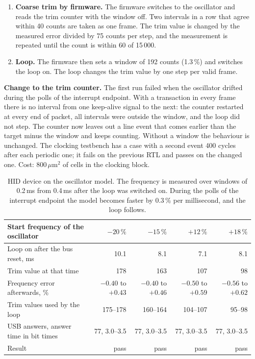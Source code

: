 \documentclass[10pt,a4paper]{article}
\begin{document}
\begin{enumerate}
\item \textbf{Coarse trim by firmware.} The firmware switches to the oscillator and reads the trim counter with
the window off. Two intervals in a row that agree within 40 counts are taken as one frame. The trim value is
changed by the measured error divided by 75 counts per step, and the measurement is repeated until the count
is within 60 of 15\,000.
\item \textbf{Loop.} The firmware then sets a window of 192 counts (1.3\,\%) and switches the loop on. The loop
changes the trim value by one step per valid frame.
\end{enumerate}

\textbf{Change to the trim counter.} The first run failed when the oscillator drifted during the polls of the
interrupt endpoint. With a transaction in every frame there is no interval from one keep-alive signal to the
next: the counter restarted at every end of packet, all intervals were outside the window, and the loop did
not step. The counter now leaves out a line event that comes earlier than the target minus the window and
keeps counting. Without a window the behaviour is unchanged. The clocking testbench has a case with a second
event 400 cycles after each periodic one; it fails on the previous RTL and passes on the changed one. Cost:
800\,$\mu$m$^2$ of cells in the clocking block.

\begin{table}[H]
\centering\small
\begin{tabularx}{\linewidth}{@{}Lrrrr@{}}
\toprule
Start frequency of the oscillator & $-20\,\%$ & $-15\,\%$ & $+12\,\%$ & $+18\,\%$ \\
\midrule
Loop on after the bus reset, ms & 10.1 & 8.1 & 7.1 & 8.1 \\
Trim value at that time & 178 & 163 & 107 & 98 \\
Frequency error afterwards, \% & $-0.40$ to $+0.43$ & $-0.40$ to $+0.46$ & $-0.50$ to $+0.59$ & $-0.56$ to $+0.62$ \\
Trim values used by the loop & 175--178 & 160--164 & 104--107 & 95--98 \\
USB answers, answer time in bit times & 77, 3.0--3.5 & 77, 3.0--3.5 & 77, 3.0--3.5 & 77, 3.0--3.5 \\
Result & pass & pass & pass & pass \\
\bottomrule
\end{tabularx}
\caption{HID device on the oscillator model. The frequency is measured over windows of 0.2\,ms from 0.4\,ms after
the loop was switched on. During the polls of the interrupt endpoint the model becomes faster by 0.3\,\% per
millisecond, and the loop follows.}
\end{table}
\end{document}

